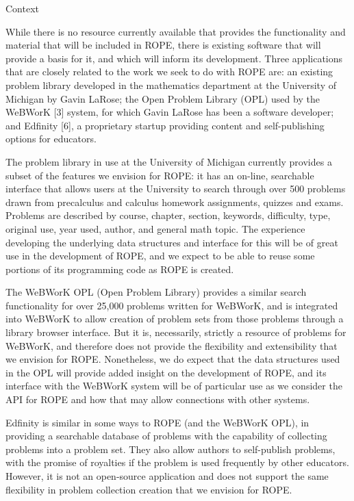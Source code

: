\documentclass[11pt]{article}
\begin{document}
\begin{section}{Context}

While there is no resource currently available that provides the
functionality and material that will be included in ROPE,
there is existing software that will provide a
basis for it, and which will inform its development.  Three applications
that are closely related to the work we seek to do with ROPE are: an
existing problem library developed in the mathematics department at the
University of Michigan by Gavin LaRose; the Open Problem Library (OPL)
used by the WeBWorK [3] %
system, for which Gavin LaRose has been a software developer; and
Edfinity [6], a proprietary startup providing content and self-publishing
options for educators.

The problem library in use at the University of Michigan currently
provides a subset of the features we envision for ROPE: it has an
on-line, searchable interface that allows users at the University to
search through over 500 problems drawn from precalculus and calculus
homework assignments, quizzes and exams.  Problems are described by
course, chapter, section, keywords, difficulty, type, original use, year
used, author, and general math topic.  The experience developing the
underlying data structures and interface for this will be of great use in
the development of ROPE, and we expect to be able to reuse some
portions of its programming code as ROPE is created.  

The WeBWorK OPL (Open Problem Library)
provides a similar search functionality for over 25,000 problems written
for WeBWorK, and is integrated into WeBWorK to allow creation of problem
sets from those problems through a library browser interface.  But it is,
necessarily, strictly a resource of problems for WeBWorK, and
therefore does not provide the flexibility and extensibility that we
envision for ROPE.  Nonetheless, we do expect that the data structures
used in the OPL will provide added insight on the development 
of ROPE, and its interface with the WeBWorK system will be of
particular use as we consider the API for ROPE and how that may allow
connections with other systems.

Edfinity is similar in some ways to ROPE (and the WeBWorK OPL), in
providing a searchable database of problems with the capability of 
collecting problems into a problem set.  They also allow authors to 
self-publish problems, with the promise of royalties if the problem is
used frequently by other educators.  However, it is not an open-source
application and does not support the same flexibility in problem
collection creation that we envision for ROPE.


\end{section}
\end{document}
